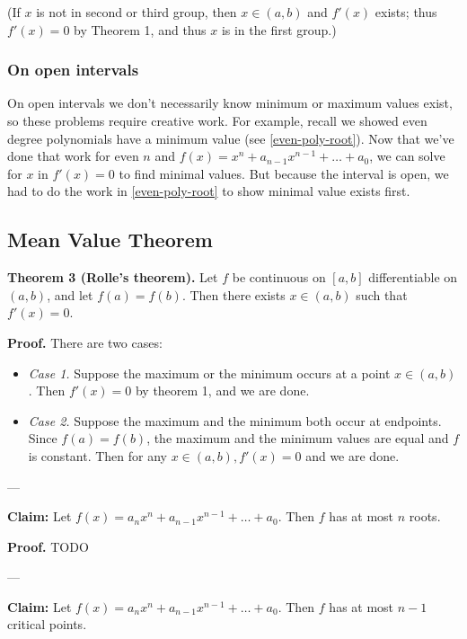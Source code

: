 (If $x$ is not in second or third group, then $x\in(a,b)$ and $f'(x)$
exists; thus $f'(x)=0$ by Theorem 1, and thus $x$ is in the first
group.)

\subsubsection*{On open intervals}

On open intervals we don't necessarily know minimum or maximum values
exist, so these problems require creative work. For example, recall we
showed even degree polynomials have a minimum value (see
\ref{even-poly-root}). Now that we've done that work for even $n$ and
$f(x)=x^{n}+a_{n-1}x^{n-1}+\ldots+a_{0}$, we can solve for $x$ in
$f'(x)=0$ to find minimal values. But because the interval is open, we
had to do the work in \ref{even-poly-root} to show minimal value
exists first.

\subsection{Mean Value Theorem}

\textbf{Theorem 3 (Rolle's theorem).} Let $f$ be continuous on $[a,b]$
differentiable on $(a,b)$, and let $f(a)=f(b)$. Then there exists
$x\in(a,b)$ such that $f'(x)=0$.

\vs

\textbf{Proof.} There are two cases:
\begin{itemize}
\item \textit{Case 1.} Suppose the maximum or the minimum occurs at a
  point $x\in(a,b)$. Then $f'(x)=0$ by theorem 1, and we are done.
\item \textit{Case 2.} Suppose the maximum and the minimum both occur
  at endpoints. Since $f(a)=f(b)$, the maximum and the minimum values
  are equal and $f$ is constant. Then for any $x\in(a,b), f'(x)=0$ and
  we are done.
\end{itemize}

\vs---\vs

\textbf{Claim:} Let $f(x)=a_nx^n+a_{n-1}x^{n-1}+\ldots+a_0$. Then
$f$ has at most $n$ roots.

\vs

\textbf{Proof.} TODO


\vs---\vs

\textbf{Claim:} Let $f(x)=a_nx^n+a_{n-1}x^{n-1}+\ldots+a_0$. Then
$f$ has at most $n-1$ critical points.

\vs

